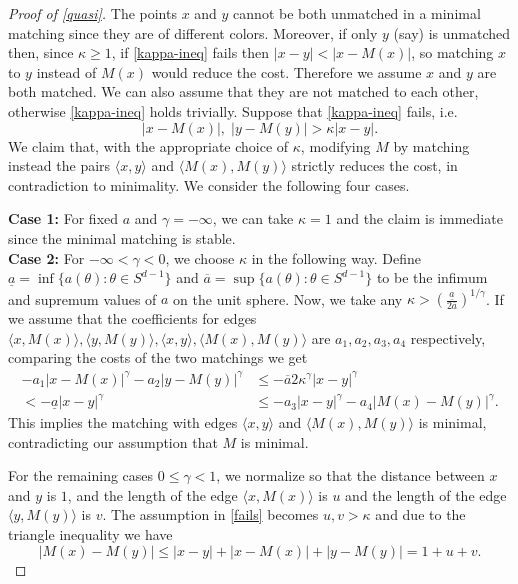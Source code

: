 \documentclass{article}
\begin{document}
\begin{proof}[Proof of \cref{quasi}]
 The points $x$ and $y$ cannot be both unmatched in a minimal matching
 since they are of different colors.  Moreover, if only $y$ (say) is unmatched then, since $\kappa\geq 1$, if \cref{kappa-ineq} fails then $|x-y|<|x-M(x)|$, so matching $x$ to $y$ instead of $M(x)$ would reduce the cost.  Therefore we  assume $x$ and $y$ are both matched.
  We can also assume that they are not matched to each other,
  otherwise \cref{kappa-ineq} holds trivially.
 Suppose that \cref{kappa-ineq} fails, i.e.\
 \begin{equation}|x-M(x)|,\;|y-M(y)|> \kappa|x-y|.\label{fails}\end{equation}
 We claim that, with the appropriate choice of $\kappa$, modifying $M$
 by matching instead the pairs $\langle x,y\rangle$ and $\langle
 M(x),M(y)\rangle$ strictly reduces the cost, in contradiction to
 minimality.
 We consider the following four cases.



\begin{leftbar}
{\bf Case 1:} For fixed $a$ and $\gamma=-\infty$, we can take
$\kappa=1$ and the claim is immediate since the minimal matching is stable.\\
{\bf Case 2: } For $-\infty<\gamma<0$, we choose $\kappa$ in the
following way. Define $\underline{a} = \inf \{a(\theta):\theta\in S^{d-1}\}$ and $\overline{a} =
\sup\{a(\theta):\theta\in S^{d-1}\}$ to be  the infimum and supremum values
of $a$ on the unit sphere. Now, we take any $\kappa>
(\frac{\underline{a}}{2\overline{a}})^{1/\gamma}$. If we assume that
the coefficients for edges $\langle x,M(x)
\rangle, \langle y,M(y) \rangle,\langle x,y \rangle, \langle M(x),M(y)
\rangle$ are $a_1,a_2,a_3,a_4$ respectively, comparing the costs of
the two matchings we get
 \begin{align*}
   -a_1|x-M(x)|^\gamma-a_2|y-M(y)|^\gamma&\leq- \overline{a} 2 \kappa^\gamma |x-y|^\gamma\\
   <-\underline{a} |x-y|^\gamma&\leq- a_3|x-y|^\gamma-a_4 |M(x)-M(y)|^\gamma.
 \end{align*}
This implies the matching with edges $\langle x,y \rangle$ and
$\langle M(x),M(y) \rangle$ is minimal, contradicting our assumption
that $M$ is minimal.
\end{leftbar}
 For the remaining cases $0\leq \gamma<1$, we normalize so that the distance
 between $x$ and $y$ is $1$, and the length of the edge $\langle
 x,M(x) \rangle$ is $u$ and the length of the edge $\langle y,M(y)
 \rangle$ is $v$. The assumption in \cref{fails} becomes $u,v>\kappa$ and
 due to the triangle inequality we have $$  |M(x)-M(y)|\leq
 |x-y|+|x-M(x)|+|y-M(y)| = 1+u+v.$$



\end{proof}
\end{document}

